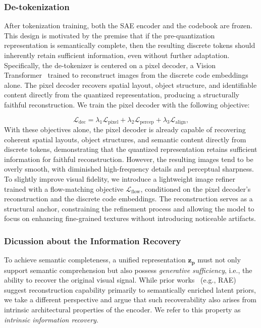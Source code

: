 \documentclass{article}
\begin{document}
\subsubsection{De-tokenization}
\label{subsubsection:de-tokenization}


After tokenization training, both the SAE encoder and the codebook are frozen. This design is motivated by the premise that if the pre-quantization representation is semantically complete, then the resulting discrete tokens should inherently retain sufficient information, even without further adaptation. Specifically, the de-tokenizer is centered on a pixel decoder, a Vision Transformer~\cite{dosovitskiy2021imageworth16x16words} trained to reconstruct images from the discrete code embeddings alone. The pixel decoder recovers spatial layout, object structure, and identifiable content directly from the quantized representation, producing a structurally faithful reconstruction. We train the pixel decoder with the following objective:

\begin{equation}
\mathcal{L}_{\text{dec}} = \lambda_1 \mathcal{L}_{\text{pixel}} + \lambda_2 \mathcal{L}_{\text{percep}} + \lambda_3 \mathcal{L}_{\text{align}},
\end{equation}
With these objectives alone, the pixel decoder is already capable of recovering coherent spatial layouts, object structures, and semantic content directly from discrete tokens, demonstrating that the quantized representation retains sufficient information for faithful reconstruction. However, the resulting images tend to be overly smooth, with diminished high-frequency details and perceptual sharpness. To slightly improve visual fidelity, we introduce a lightweight image refiner trained with a flow-matching objective $\mathcal{L}_{\text{flow}}$, conditioned on the pixel decoder’s reconstruction and the discrete code embeddings. The reconstruction serves as a structural anchor, constraining the refinement process and allowing the model to focus on enhancing fine-grained textures without introducing noticeable artifacts.

\subsubsection*{Dicussion about the Information Recovery}



To achieve semantic completeness, a unified representation $\mathbf{z}_\mathbf{p}$ must not only support semantic comprehension but also possess \textit{generative sufficiency}, i.e., the ability to recover the original visual signal. While prior works~\cite{rae,zheng2025diffusion} (e.g., RAE) suggest reconstruction capability primarily to semantically enriched latent priors, we take a different perspective and argue that such recoverability also arises from intrinsic architectural properties of the encoder. We refer to this property as \textit{intrinsic information recovery}.
\end{document}
